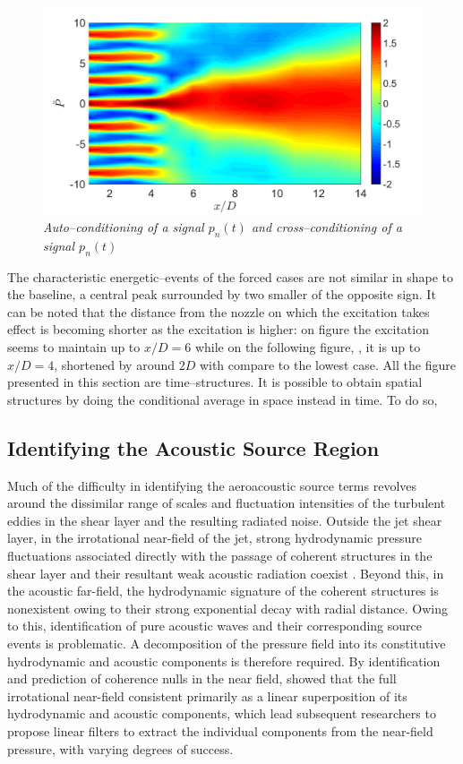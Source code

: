 \begin{figure}
	\centering
	\includegraphics[width=1\textwidth]{Figures/conditioning/autoCondSt0p35.png}
	\caption{\textit{Auto--conditioning of a signal $p_n(t)$ and cross--conditioning of a signal $p_n(t)$}}
	\label{fig:autoCondSt0p35}
\end{figure}
The characteristic energetic--events of the forced cases are not similar in shape to the baseline, a central peak surrounded by two smaller of the opposite sign. It can be noted that the distance from the nozzle on which the excitation takes effect is becoming shorter as the excitation is higher: on figure  the excitation seems to maintain up to $x/D=6$ while on the following figure, , it is up to $x/D=4$, shortened by around $2D$ with compare to the lowest case. 
All the figure presented in this section are time--structures. It is possible to obtain spatial structures by doing the conditional average in space instead in time. To do so, 

\subsection{Identifying the Acoustic Source Region}
\label{sect:near_field_source_region}
Much of the difficulty in identifying the aeroacoustic source terms revolves around the dissimilar range of scales and fluctuation intensities of the turbulent eddies in the shear layer and the resulting radiated noise. 
Outside the jet shear layer, in the irrotational near-field of the jet, strong hydrodynamic pressure fluctuations associated directly with the passage of coherent structures in the shear layer and their resultant weak acoustic radiation coexist \citep{Arndt1997}. 
Beyond this, in the acoustic far-field, the hydrodynamic signature of the coherent structures is nonexistent owing to their strong exponential decay with radial distance.
Owing to this, identification of pure acoustic waves and their corresponding source events is problematic.
A decomposition of the pressure field into its constitutive hydrodynamic and acoustic components is therefore required. 
By identification and prediction of coherence nulls in the near field, \citet{Coiffet2006} showed that the full irrotational near-field consistent primarily as a linear superposition of its hydrodynamic and acoustic components, which lead subsequent researchers to propose linear filters to extract the individual components from the near-field pressure, with varying degrees of success. 

